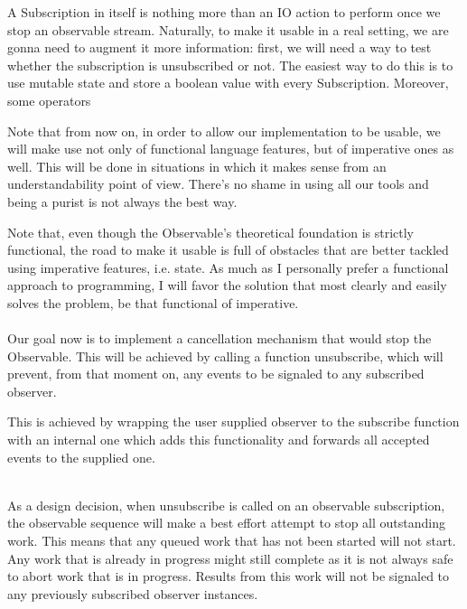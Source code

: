 A Subscription in itself is nothing more than an IO action to perform once we stop an observable stream. Naturally, to make it usable in a real setting, we are gonna need to augment it more information: first, we will need a way to test whether the subscription is unsubscribed or not. The easiest way to do this is to use mutable state and store a boolean value with every Subscription. Moreover, some operators 

Note that from now on, in order to allow our implementation to be usable, we will make use not only of functional language features, but of imperative ones as well. This will be done in situations in which it makes sense from an understandability point of view. There's no shame in using all our tools and being a purist is not always the best way.

Note that, even though the Observable's theoretical foundation is strictly functional, the road to make it usable is full of obstacles that are better tackled using imperative features, i.e. state. As much as I personally prefer a functional approach to programming, I will favor the solution that most clearly and easily solves the problem, be that functional of imperative.\\

\\

Our goal now is to implement a cancellation mechanism that would stop the Observable. This will be achieved by calling a function unsubscribe, which will prevent, from that moment on, any events to be signaled to any subscribed observer.

This is achieved by wrapping the user supplied observer to the subscribe function with an internal one which adds this functionality and forwards all accepted events to the supplied one.

\\

As a design decision, when unsubscribe is called on an observable subscription, the observable sequence will make a best effort attempt to stop all outstanding work. This means that any queued work that has not been started will not start. Any work that is already in progress might still complete as it is not always safe to abort work that is in progress. Results from this work will not be signaled to any previously subscribed observer instances.


